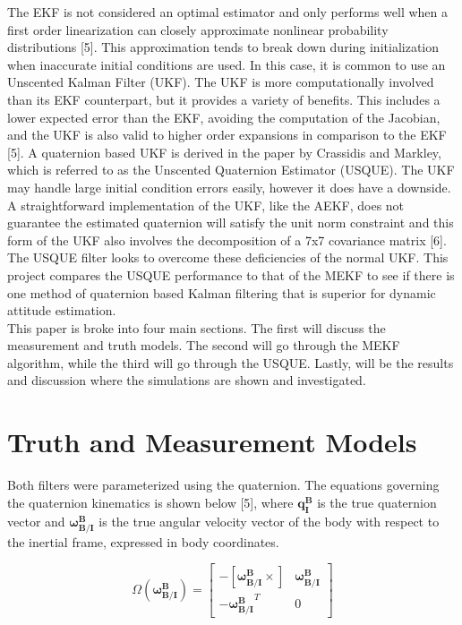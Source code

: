 \documentclass[12pt]{report}
\begin{document}
\noindent The EKF is not considered an optimal estimator and only performs well when a first order linearization can closely approximate nonlinear probability distributions [5]. This approximation tends to break down during initialization when inaccurate initial conditions are used. In this case, it is common to use an Unscented Kalman Filter (UKF). The UKF is more computationally involved than its EKF counterpart, but it provides a variety of benefits. This includes a lower expected error than the EKF, avoiding the computation of the Jacobian, and the UKF is also valid to higher order expansions in comparison to the EKF [5]. A quaternion based UKF is derived in the paper by Crassidis and Markley, which is referred to as the Unscented Quaternion Estimator (USQUE). The UKF may handle large initial condition errors easily, however it does have a downside. A straightforward implementation of the UKF, like the AEKF, does not guarantee the estimated quaternion will satisfy the unit norm constraint and this form of the UKF also involves the decomposition of a 7x7 covariance matrix [6]. The USQUE filter looks to overcome these deficiencies of the normal UKF. This project compares the USQUE performance to that of the MEKF to see if there is one method of quaternion based Kalman filtering that is superior for dynamic attitude estimation.\\

\noindent This paper is broke into four main sections. The first will discuss the measurement and truth models. The second will go through the MEKF algorithm, while the third will go through the USQUE. Lastly, will be the results and discussion where the simulations are shown and investigated. 

\section*{Truth and Measurement Models}
\noindent Both filters were parameterized using the quaternion. The equations governing the quaternion kinematics is shown below [5], where $\pmb{q_I^B}$ is the true quaternion vector and $\pmb{\omega_{B/I}^B}$ is the true angular velocity vector of the body with respect to the inertial frame, expressed in body coordinates.

\begin{equation}
	\Omega(\pmb{\omega_{B/I}^B}) = \begin{bmatrix}
		-[\pmb{\omega_{B/I}^B} \times] & \pmb{\omega_{B/I}^B} \\
		-\pmb{\omega_{B/I}^B}^T & 0
	\end{bmatrix}
\end{equation}  
\end{document}
